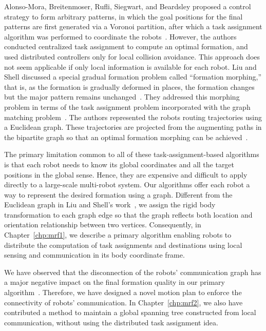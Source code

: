 Alonso-Mora, Breitenmoser, Rufli, Siegwart, and Beardsley proposed a control
strategy to form arbitrary patterns, in which the goal positions for the final
patterns are first generated via a Voronoi partition, after which a task
assignment algorithm was performed to coordinate the robots~\cite{AloBreRufSieBea11}. 
%
However, the authors conducted centralized task assignment to compute an optimal formation, and used distributed controllers only for local collision avoidance.  
%
This approach does not seem applicable if only local information is available for each robot.  
%
Liu and Shell discussed a special gradual formation problem called ``formation morphing,'' 
that is, as the formation is gradually deformed in places, the formation changes but the major
pattern remains unchanged~\cite{LiuShe12}. 
%
They addressed this morphing problem in terms of the task assignment problem incorporated with the graph matching problem~\cite{Lov86}. 
%
The authors represented the robots routing trajectories using a Euclidean graph.  
%
These trajectories are projected from the augmenting paths in the bipartite graph 
so that an optimal formation morphing can be achieved~\cite{LiuShe12}.

The primary limitation common to all of these task-assignment-based algorithms
is that each robot needs to know its global coordinates and all the target
positions in the global sense. 
%
Hence, they are expensive and difficult to apply directly to a large-scale multi-robot system. 
%
Our algorithms offer each robot a way to represent the desired formation using a graph.
%
Different from the Euclidean graph in Liu and Shell's work~\cite{LiuShe12},
we assign the rigid body transformation to each graph edge so that the graph
reflects both location and orientation relationship between two vertices. 
%
Consequently, in Chapter~\ref{chp:mrf1}, we describe a primary algorithm enabling robots to
distribute the computation of task assignments and destinations using local sensing
and communication in its body coordinate frame.


We have observed that the disconnection of the robots' communication
graph has a major negative impact on the final formation quality in our
primary algorithm~\cite{SonOKa14}. 
%
Therefore, we have designed a novel motion plan to enforce the connectivity of robots' communication.
%
In Chapter~\ref{chp:mrf2}, we also have contributed a method to maintain a global
spanning tree constructed from local communication, 
without using the distributed task assignment idea.


